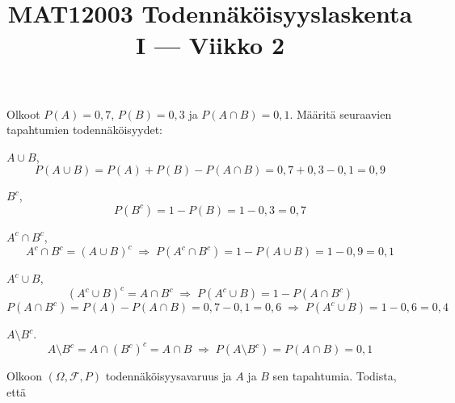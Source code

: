 \documentclass[12pt,a4paper]{article}
\title{MAT12003 Todennäköisyyslaskenta I — Viikko 2}
\date{}
\begin{document}
\maketitle

Olkoot $P(A)=0{,}7$, $P(B)=0{,}3$ ja $P(A\cap B)=0{,}1$.
Määritä seuraavien tapahtumien todennäköisyydet: 

\begin{kohta}
  \item $A\cup B$,
  \[
  P(A\cup B)=P(A)+P(B)-P(A\cap B)=0{,}7+0{,}3-0{,}1=0{,}9
  \]

  \item $B^c$,
  \[
  P(B^c)=1-P(B)=1-0{,}3=0{,}7
  \]

  \item $A^c\cap B^c$,
  \[
  A^c\cap B^c=(A\cup B)^c \;\Rightarrow\; P(A^c\cap B^c)=1-P(A\cup B)=1-0{,}9=0{,}1
  \]

  \item $A^c\cup B$,
  \[
  (A^c\cup B)^c=A\cap B^c \;\Rightarrow\; P(A^c\cup B)=1-P(A\cap B^c)
  \]
  \[
  P(A\cap B^c)=P(A)-P(A\cap B)=0{,}7-0{,}1=0{,}6 \;\Rightarrow\; P(A^c\cup B)=1-0{,}6=0{,}4
  \]

  \item $A\setminus B^c$.
  \[
  A\setminus B^c = A\cap (B^c)^c = A\cap B \;\Rightarrow\; P(A\setminus B^c)=P(A\cap B)=0{,}1
  \]
\end{kohta}








\newpage
{}
Olkoon $(\Omega,\mathcal{F},P)$  todennäköisyysavaruus ja $A$ ja $B$ sen tapahtumia. Todista, että

\end{document}
